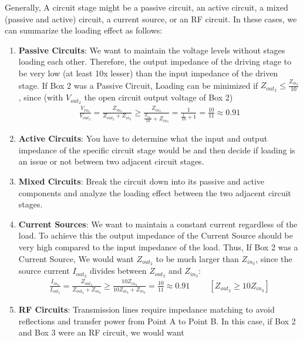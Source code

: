 Generally, A circuit stage might be a passive circuit, an active circuit,
a mixed (passive and active) circuit, a current source, or an RF circuit.
In these cases, we can summarize the loading effect as follows:

\begin{enumerate}
  \item \textbf{Passive Circuits}: We want to maintain the voltage
    levels without stages loading each other. Therefore, the output
    impedance of the driving stage to be very low (at least 10x lesser)
    than the input impedance of the driven stage. If Box 2 was a Passive
    Circuit, Loading can be minimized if \(Z_{out_2} \leq \frac{Z_{in_3}}{10}\), since
    (with \(V_{out_2}\) the open circuit output voltage of Box 2)
    \begin{align*}
      \frac{V_{in_3}}{V_{out_2}} = \frac{Z_{in_3}}{Z_{out_2} + Z_{in_3}}
      \geq \frac{Z_{in_3}}{\frac{Z_{in_3}}{10} + Z_{in_3}} = \frac{1}{\frac{1}{10} + 1} = \frac{10}{11} \approx 0.91
    \end{align*}
  \item \textbf{Active Circuits}: You have to determine what the
    input and output impedance of the specific circuit stage would
    be and then decide if loading is an issue or not between two
    adjacent circuit stages.
  \item \textbf{Mixed Circuits}: Break the circuit down into its
    passive and active components and analyze the loading effect between
    the two adjacent circuit stages.
  \item \textbf{Current Sources}: We want to maintain a constant current
    regardless of the load. To achieve this the output impedance
    of the Current Source should be very high compared to the input
    impedance of the load. Thus, If Box 2 was a Current Source, We would
    want $Z_{out_2}$ to be much larger than $Z_{in_3}$, since the source
    current \(I_{out_2}\) divides between \(Z_{out_2}\) and \(Z_{in_3}\):
    \begin{align*}
      \frac{I_{in_3}}{I_{out_2}} = \frac{Z_{out_2}}{Z_{out_2} + Z_{in_3}}
      \geq \frac{10 Z_{in_3}}{10 Z_{in_3} + Z_{in_3}} = \frac{10}{11} \approx 0.91
      \hspace{1cm} [Z_{out_2} \geq 10 Z_{in_3}]
    \end{align*}
  \item \textbf{RF Circuits}: Transmission lines require impedance matching
    to avoid reflections and transfer power from Point A to Point B. In
    this case, if Box 2 and Box 3 were an RF circuit, we would want

\end{enumerate}
